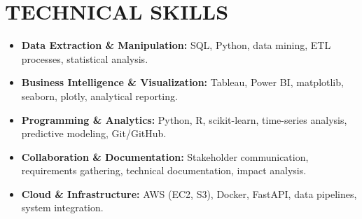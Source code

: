 \documentclass[a4paper,9pt]{extarticle}
\begin{document}
\section*{TECHNICAL SKILLS}

\begin{itemize}[leftmargin=0.5cm, label={}]
    \item \textbf{Data Extraction \& Manipulation:} SQL, Python, data mining, ETL processes, statistical analysis. \\
    
    \item \textbf{Business Intelligence \& Visualization:} Tableau, Power BI, matplotlib, seaborn, plotly, analytical reporting. \\
    
    \item \textbf{Programming \& Analytics:} Python, R, scikit-learn, time-series analysis, predictive modeling, Git/GitHub. \\
    
    \item \textbf{Collaboration \& Documentation:} Stakeholder communication, requirements gathering, technical documentation, impact analysis. \\
    
    \item \textbf{Cloud \& Infrastructure:} AWS (EC2, S3), Docker, FastAPI, data pipelines, system integration.
\end{itemize}

\end{document}
